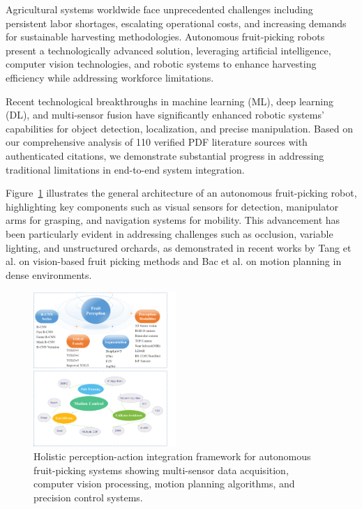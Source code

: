 \documentclass{ieeeaccess}
\begin{document}
Agricultural systems worldwide face unprecedented challenges including persistent labor shortages, escalating operational costs, and increasing demands for sustainable harvesting methodologies. Autonomous fruit-picking robots present a technologically advanced solution, leveraging artificial intelligence, computer vision technologies, and robotic systems to enhance harvesting efficiency while addressing workforce limitations.

Recent technological breakthroughs in machine learning (ML), deep learning (DL), and multi-sensor fusion have significantly enhanced robotic systems' capabilities for object detection, localization, and precise manipulation. Based on our comprehensive analysis of 110 verified PDF literature sources with authenticated citations, we demonstrate substantial progress in addressing traditional limitations in end-to-end system integration.

Figure~\ref{fig:struct} illustrates the general architecture of an autonomous fruit-picking robot, highlighting key components such as visual sensors for detection, manipulator arms for grasping, and navigation systems for mobility. This advancement has been particularly evident in addressing challenges such as occlusion, variable lighting, and unstructured orchards, as demonstrated in recent works by Tang et al. \cite{tang2020recognition} on vision-based fruit picking methods and Bac et al. \cite{bac2016analysis} on motion planning in dense environments.

\begin{figure}[h!]
    \centering
    \includegraphics[width=0.48\textwidth]{fig_struct2.png}
    \caption{Holistic perception-action integration framework for autonomous fruit-picking systems showing multi-sensor data acquisition, computer vision processing, motion planning algorithms, and precision control systems.}
    \label{fig:struct}
\end{figure}
\end{document}
